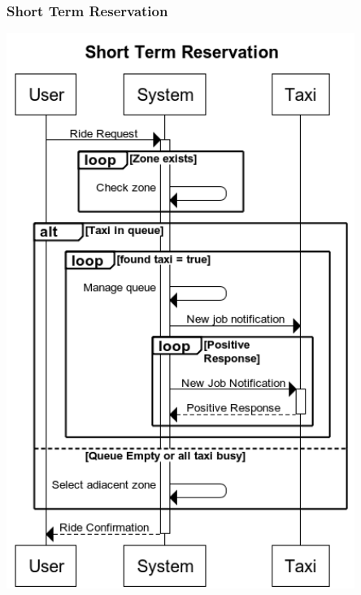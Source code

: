 	\subsubsection{Short Term Reservation}
		\begin{center}
			\includegraphics[width=0.85\textwidth]{./images/Short_Term_Reservation_Complete.png}
		\end{center}
